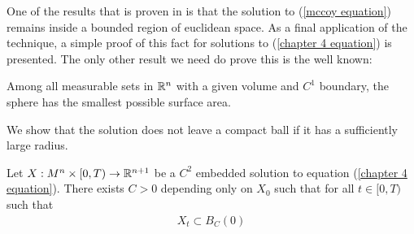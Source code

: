 One of the results that is proven in \cite{mccoy} is that the solution to (\ref{mccoy equation}) remains inside a bounded region of euclidean space. As a final application of the technique, a simple proof of this fact for solutions to (\ref{chapter 4 equation}) is presented. The only other result we need do prove this is the well known:
\begin{theorem}
	Among all measurable sets in $\mathbb{R}^n$ with a given volume and $C^1$ boundary, the sphere has the smallest possible surface area.
\end{theorem} 
We show that the solution does not leave a compact ball if it has a sufficiently large radius.
\begin{comment}
First, we want to prove the following lemma: 
	
	\begin{lemma}
		Let $X:M^n\times [0,T) \rightarrow \R^{n+1}$ be a $C^2$ embedded solution to equation (\ref{chapter 4 equation}), let $\pi$ be a plane. If $X_0 \subset H^-(\pi)$, then it is not possible that $X_t \subset H^+(\pi)$ for all times $t \in [0,T)$\label{cannot cross plane ch4}
	\end{lemma}
	In other words, a solution cannot completely cross from one side of a given plane to the other side.
	\begin{proof}
		Suppose by contradiction that this happens. We can always reflect $X_t$ strictly about $\pi$, by theorem \ref{chow gulliver chapter 4}, because it does not intersect $X_0$. This implies that $X_t^\pi\cap H^-(\pi) \subset \mathrm{int}(X_t)\cap  H^-(\pi)$. But $X_t \subset H^+(\pi)$  implies that $\mathrm{int}(X_t)\cap  H^-(\pi)=\emptyset$ and  $\emptyset \neq X_t^\pi \subset H^-(\pi)$, a contradiction
	\end{proof}
	Finally, we show that the solution does not leave a compact ball if it has a sufficiently large radius. 
\end{comment}
\begin{proposition}
	Let $X:M^n\times [0,T) \rightarrow \mathbb{R}^{n+1}$ be a $C^2$ embedded solution to equation (\ref{chapter 4 equation}). There exists $C>0$ depending only on $X_0$ such that for all $t\in[0, T)$ such that 
	\begin{align*}
		X_t \subset B_C(0)
	\end{align*}
\end{proposition}
